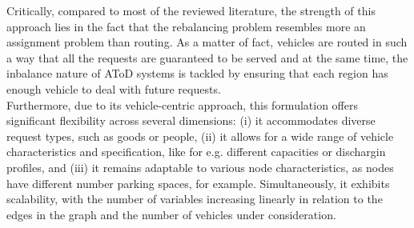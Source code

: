 Critically, compared to most of the reviewed literature, the strength of this approach lies in the fact that the rebalancing problem resembles more an assignment problem than routing. As a matter of fact, vehicles are routed in such a way that all the requests are guaranteed to be served and at the same time, the inbalance nature of AToD systems is tackled by ensuring that each region has enough vehicle to deal with future requests. \\
Furthermore, due to its vehicle-centric approach, this formulation offers significant flexibility across several dimensions: (i) it accommodates diverse request types, such as goods or people, (ii) it allows for a wide range of vehicle characteristics and specification, like for e.g. different capacities or dischargin profiles, and (iii) it remains adaptable to various node characteristics, as nodes have different number parking spaces, for example. Simultaneously, it exhibits scalability, with the number of variables increasing linearly in relation to the edges in the graph and the number of vehicles under consideration.
%
%
%


